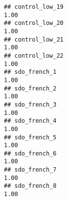 \documentclass[
]{article}
\begin{document}
\begin{verbatim}
## control_low_19                                                                                                                                                                                                              1.00
## control_low_20                                                                                                                                                                                                              1.00
## control_low_21                                                                                                                                                                                                              1.00
## control_low_22                                                                                                                                                                                                              1.00
## sdo_french_1                                                                                                                                                                                                                1.00
## sdo_french_2                                                                                                                                                                                                                1.00
## sdo_french_3                                                                                                                                                                                                                1.00
## sdo_french_4                                                                                                                                                                                                                1.00
## sdo_french_5                                                                                                                                                                                                                1.00
## sdo_french_6                                                                                                                                                                                                                1.00
## sdo_french_7                                                                                                                                                                                                                1.00
## sdo_french_8                                                                                                                                                                                                                1.00

\end{verbatim}
\end{document}
